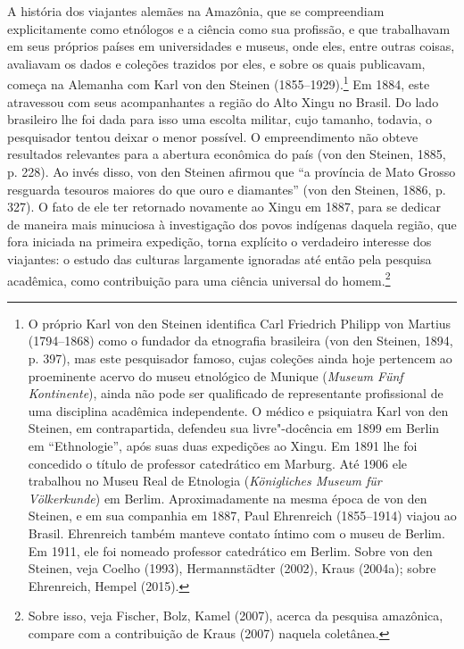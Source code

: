 A história dos viajantes alemães na Amazônia, que se compreendiam
explicitamente como etnólogos e a ciência como sua profissão, e que
trabalhavam em seus próprios países em universidades e museus, onde
eles, entre outras coisas, avaliavam os dados e coleções trazidos por
eles, e sobre os quais publicavam, começa na Alemanha com Karl von den
Steinen (1855--1929).\footnote{O próprio Karl von den Steinen identifica
  Carl Friedrich Philipp von Martius (1794--1868) como o fundador da
  etnografia brasileira (von den Steinen, 1894, p. 397), mas este
  pesquisador famoso, cujas coleções ainda hoje pertencem ao proeminente
  acervo do museu etnológico de Munique (\emph{Museum Fünf Kontinente}),
  ainda não pode ser qualificado de representante profissional de uma
  disciplina acadêmica independente. O médico e psiquiatra Karl von den
  Steinen, em contrapartida, defendeu sua livre"-docência em 1899 em
  Berlin em ``Ethnologie'', após suas duas expedições ao Xingu. Em 1891
  lhe foi concedido o título de professor catedrático em Marburg. Até
  1906 ele trabalhou no Museu Real de Etnologia (\emph{Königliches
  Museum für Völkerkunde}) em Berlim. Aproximadamente na mesma época de
  von den Steinen, e em sua companhia em 1887, Paul Ehrenreich
  (1855--1914) viajou ao Brasil. Ehrenreich também manteve contato íntimo
  com o museu de Berlim. Em 1911, ele foi nomeado professor catedrático
  em Berlim. Sobre von den Steinen, veja Coelho (1993), Hermannstädter
  (2002), Kraus (2004a); sobre Ehrenreich, Hempel (2015).} Em 1884, este
atravessou com seus acompanhantes a região do Alto Xingu no Brasil. Do
lado brasileiro lhe foi dada para isso uma escolta militar, cujo
tamanho, todavia, o pesquisador tentou deixar o menor possível. O
empreendimento não obteve resultados relevantes para a abertura
econômica do país (von den Steinen, 1885, p. 228). Ao invés disso, von
den Steinen afirmou que ``a província de Mato Grosso resguarda tesouros
maiores do que ouro e diamantes'' (von den Steinen, 1886, p. 327). O
fato de ele ter retornado novamente ao Xingu em 1887, para se dedicar de
maneira mais minuciosa à investigação dos povos indígenas daquela
região, que fora iniciada na primeira expedição, torna explícito o
verdadeiro interesse dos viajantes: o estudo das culturas largamente
ignoradas até então pela pesquisa acadêmica, como contribuição para uma
ciência universal do homem.\footnote{Sobre isso, veja Fischer, Bolz,
  Kamel (2007), acerca da pesquisa amazônica, compare com a
  contribuição de Kraus (2007) naquela coletânea.}

